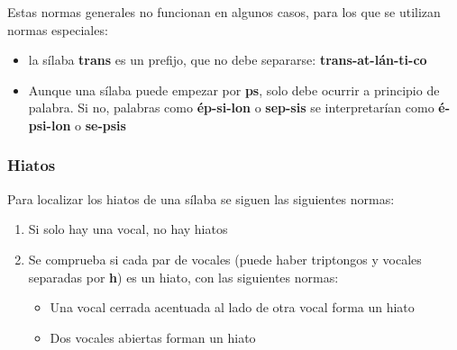 \documentclass[11pt]{article}
\begin{document}
Estas normas generales no funcionan en algunos casos, para los que se utilizan normas especiales:
\begin{itemize}
\item la sílaba \textbf{trans} es un prefijo, que no debe separarse: \textbf{trans-at-lán-ti-co}
\item Aunque una sílaba puede empezar por \textbf{ps}, solo debe ocurrir a principio de palabra. Si no, palabras como \textbf{ép-si-lon} o \textbf{sep-sis} se interpretarían como \textbf{é-psi-lon} o \textbf{se-psis}
\end{itemize}

\subsubsection{Hiatos}
\label{sec:org0000006}
Para localizar los hiatos de una sílaba se siguen las siguientes normas:
\begin{enumerate}
\item Si solo hay una vocal, no hay hiatos
\item Se comprueba si cada par de vocales (puede haber triptongos y vocales separadas por \textbf{h}) es un hiato, con las siguientes normas:
\begin{itemize}
\item Una vocal cerrada acentuada al lado de otra vocal forma un hiato
\item Dos vocales abiertas forman un hiato
\end{itemize}
\end{enumerate}
\end{document}
